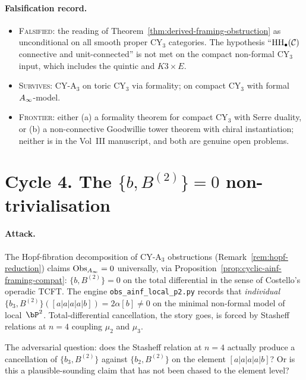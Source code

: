 \paragraph{Falsification record.}
\begin{itemize}
\item
\textsc{Falsified}: the reading of
Theorem~\ref{thm:derived-framing-obstruction} as unconditional
on all smooth proper CY$_3$ categories.  The hypothesis
``$\mathrm{HH}_\bullet(\mathcal{C})$ connective and unit-connected'' is not met
on the compact non-formal CY$_3$ input, which includes the
quintic and $K3 \times E$.

\item
\textsc{Survives}: CY-A$_3$ on toric CY$_3$ via
formality; on compact CY$_3$ with formal $A_\infty$-model.

\item
\textsc{Frontier}: either
(a) a formality theorem for compact CY$_3$ with Serre duality, or
(b) a non-connective Goodwillie tower theorem with chiral
instantiation; neither is in the Vol~III manuscript, and both
are genuine open problems.
\end{itemize}

\section*{Cycle 4. The $\{b, B^{(2)}\} = 0$ non-trivialisation}

\paragraph{Attack.} The Hopf-fibration decomposition of CY-A$_3$
obstructions (Remark~\ref{rem:hopf-reduction}) claims
$\mathrm{Obs}_{A_\infty} = 0$ universally, via
Proposition~\ref{prop:cyclic-ainf-framing-compat}:
$\{b, B^{(2)}\} = 0$ on the total differential in the sense of
Costello's operadic TCFT. The engine
\texttt{obs\_ainf\_local\_p2.py} records that \emph{individual}
$\{b_3, B^{(2)}\}([a|a|a|a|b]) = 2\alpha [b] \neq 0$ on the
minimal non-formal model of local~$\bP^2$. Total-differential
cancellation, the story goes, is forced by Stasheff relations at
$n=4$ coupling $\mu_2$ and $\mu_3$.

The adversarial question: does the Stasheff relation at $n=4$
actually produce a cancellation of $\{b_3, B^{(2)}\}$ against
$\{b_2, B^{(2)}\}$ on the element $[a|a|a|a|b]$? Or is this a
plausible-sounding claim that has not been chased to the element
level?

